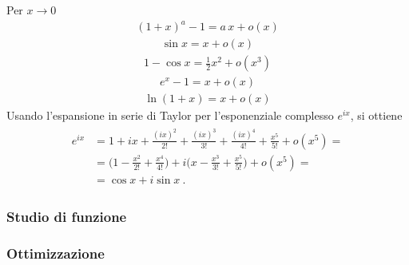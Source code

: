 \documentclass[letterpaper,10pt,english]{jupyterBook}
\begin{document}
\sphinxAtStartPar
{}
Per \(x \rightarrow 0\)
\begin{equation*}
\begin{split}(1+x)^a - 1 = a \, x + o(x)\end{split}
\end{equation*}\begin{equation*}
\begin{split}\sin x = x +o(x)\end{split}
\end{equation*}\begin{equation*}
\begin{split}1 - \cos x = \frac{1}{2} x^2 + o(x^3)\end{split}
\end{equation*}\begin{equation*}
\begin{split}e^x - 1 = x + o(x)\end{split}
\end{equation*}\begin{equation*}
\begin{split}\ln(1+x) = x + o(x)\end{split}
\end{equation*}
\sphinxAtStartPar
{} Usando l’espansione in serie di Taylor per l’esponenziale complesso \(e^{ix}\), si ottiene
\begin{equation*}
\begin{split}\begin{aligned}
e^{ix} & = 1 + ix + \frac{(ix)^2}{2!} + \frac{(ix)^3}{3!} + \frac{(ix)^4}{4!} + \frac{x^5}{5!} + o(x^5) = \\
& = \Big( 1 - \frac{x^2}{2!} + \frac{x^4}{4!} \Big) + i \Big( x - \frac{x^3}{3!} + \frac{x^5}{5!} \Big) + o(x^5) = \\
& = \cos x + i \sin x \ .
\end{aligned}\end{split}
\end{equation*}

\subsubsection{Studio di funzione}
\label{\detokenize{ch/infinitesimal_calculus/derivatives:studio-di-funzione}}

\subsubsection{Ottimizzazione}
\label{\detokenize{ch/infinitesimal_calculus/derivatives:ottimizzazione}}
\sphinxstepscope
\end{document}
